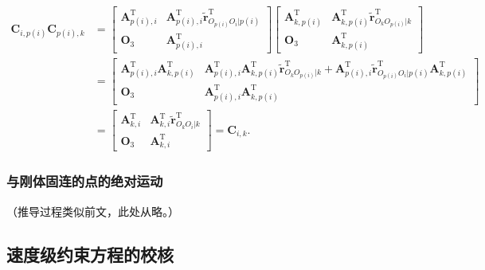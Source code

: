 \begin{equation}\label{eq:11.58}
\begin{aligned}
\boldsymbol{C}_{i,p(i)} \boldsymbol{C}_{p(i),k} &=
\begin{bmatrix}
\boldsymbol{A}_{p(i),i}^{\mathrm{T}} & \boldsymbol{A}_{p(i),i}^{\mathrm{T}} \tilde{\boldsymbol{r}}_{O_{p(i)}O_i|p(i)}^{\mathrm{T}} \\[4pt]
\boldsymbol{O}_3 & \boldsymbol{A}_{p(i),i}^{\mathrm{T}}
\end{bmatrix}
\begin{bmatrix}
\boldsymbol{A}_{k,p(i)}^{\mathrm{T}} & \boldsymbol{A}_{k,p(i)}^{\mathrm{T}} \tilde{\boldsymbol{r}}_{O_kO_{p(i)}|k}^{\mathrm{T}} \\[4pt]
\boldsymbol{O}_3 & \boldsymbol{A}_{k,p(i)}^{\mathrm{T}}
\end{bmatrix} \\[10pt]
&= \begin{bmatrix}
\boldsymbol{A}_{p(i),i}^{\mathrm{T}} \boldsymbol{A}_{k,p(i)}^{\mathrm{T}} & \boldsymbol{A}_{p(i),i}^{\mathrm{T}} \boldsymbol{A}_{k,p(i)}^{\mathrm{T}} \tilde{\boldsymbol{r}}_{O_kO_{p(i)}|k}^{\mathrm{T}} + \boldsymbol{A}_{p(i),i}^{\mathrm{T}} \tilde{\boldsymbol{r}}_{O_{p(i)}O_i|p(i)}^{\mathrm{T}} \boldsymbol{A}_{k,p(i)}^{\mathrm{T}} \\[4pt]
\boldsymbol{O}_3 & \boldsymbol{A}_{p(i),i}^{\mathrm{T}} \boldsymbol{A}_{k,p(i)}^{\mathrm{T}}
\end{bmatrix} \\[10pt]
&= \begin{bmatrix}
\boldsymbol{A}_{k,i}^{\mathrm{T}} & \boldsymbol{A}_{k,i}^{\mathrm{T}} \tilde{\boldsymbol{r}}_{O_kO_i|k}^{\mathrm{T}} \\[4pt]
\boldsymbol{O}_3 & \boldsymbol{A}_{k,i}^{\mathrm{T}}
\end{bmatrix}
= \boldsymbol{C}_{i,k}.
\end{aligned}
\end{equation}

\subsubsection{与刚体固连的点的绝对运动}

（推导过程类似前文，此处从略。）

\subsection{速度级约束方程的校核}


